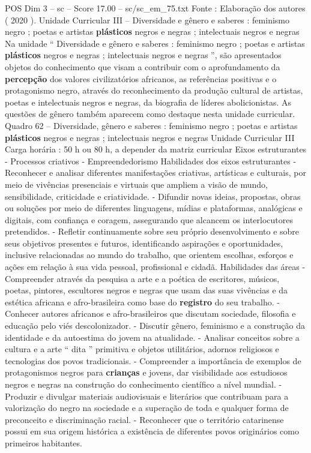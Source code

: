 \begin{textsample}{POS Dim 3 – sc – Score 17.00 – sc/sc\_em\_75.txt}
Fonte : Elaboração dos autores ( 2020 ).
Unidade Curricular III – Diversidade e gênero e saberes : feminismo negro ; poetas e artistas \textbf{plásticos} negros e negras ; intelectuais negros e negras Na unidade “ Diversidade e gênero e saberes : feminismo negro ; poetas e artistas \textbf{plásticos} negros e negras ; intelectuais negros e negras ”, são apresentados objetos do conhecimento que visam a contribuir com o aprofundamento da \textbf{percepção} dos valores civilizatórios africanos, as referências positivas e o protagonismo negro, através do reconhecimento da produção cultural de artistas, poetas e intelectuais negros e negras, da biografia de líderes abolicionistas.
As questões de gênero também aparecem como destaque nesta unidade curricular.
Quadro 62 – Diversidade, gênero e saberes : feminismo negro ; poetas e artistas \textbf{plásticos} negros e negras ; intelectuais negros e negras Unidade Curricular III Carga horária : 50 h ou 80 h, a depender da matriz curricular Eixos estruturantes - Processos criativos - Empreendedorismo Habilidades dos eixos estruturantes - Reconhecer e analisar diferentes manifestações criativas, artísticas e culturais, por meio de vivências presenciais e virtuais que ampliem a visão de mundo, sensibilidade, criticidade e criatividade. - Difundir novas ideias, propostas, obras ou soluções por meio de diferentes linguagens, mídias e plataformas, analógicas e digitais, com confiança e coragem, assegurando que alcancem os interlocutores pretendidos. - Refletir continuamente sobre seu próprio desenvolvimento e sobre seus objetivos presentes e futuros, identificando aspirações e oportunidades, inclusive relacionadas ao mundo do trabalho, que orientem escolhas, esforços e ações em relação à sua vida pessoal, profissional e cidadã.
Habilidades das áreas - Compreender através da pesquisa a arte e a poética de escritores, músicos, poetas, pintores, escultores negros e negras que usam das suas vivências e da estética africana e afro-brasileira como base do \textbf{registro} do seu trabalho. - Conhecer autores africanos e afro-brasileiros que discutam sociedade, filosofia e educação pelo viés descolonizador. - Discutir gênero, feminismo e a construção da identidade e da autoestima do jovem na atualidade. - Analisar conceitos sobre a cultura e a arte “ dita ” primitiva e objetos utilitários, adornos religiosos e tecnologias dos povos tradicionais. - Compreender a importância de exemplos de protagonismos negros para \textbf{crianças} e jovens, dar visibilidade aos estudiosos negros e negras na construção do conhecimento científico a nível mundial. - Produzir e divulgar materiais audiovisuais e literários que contribuam para a valorização do negro na sociedade e a superação de toda e qualquer forma de preconceito e discriminação racial. - Reconhecer que o território catarinense possui em sua origem histórica a existência de diferentes povos originários como primeiros habitantes.

\end{textsample}
